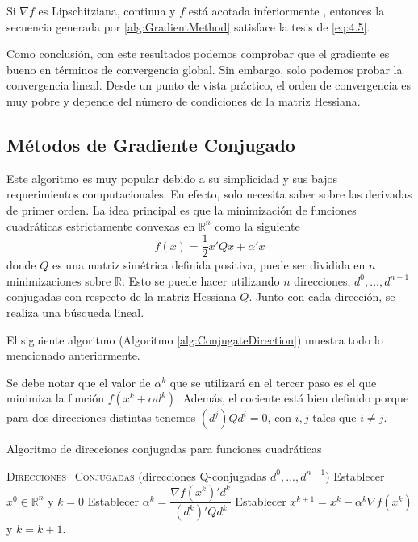 \begin{proposicion}
Si $\nabla f$ es Lipschitziana, continua y $f$ está acotada inferiormente , entonces la secuencia generada por \ref{alg:GradientMethod} satisface la tesis de \ref{eq:4.5}.
\end{proposicion}

Como conclusión, con este resultados podemos comprobar que el gradiente es bueno en términos de convergencia global. 
Sin embargo, solo podemos probar la convergencia lineal. 
Desde un punto de vista práctico, el orden de convergencia es muy pobre y depende del número de condiciones de la matriz Hessiana.

\subsection{Métodos de Gradiente Conjugado}

Este algoritmo es muy popular debido a su simplicidad y sus bajos requerimientos computacionales. 
En efecto, solo necesita saber sobre las derivadas de primer orden. 
La idea principal es que la minimización de funciones cuadráticas estrictamente convexas en $\mathbb{R}^n$ como la siguiente
\begin{equation}
f(x) = \dfrac{1}{2}x'Qx+\alpha'x
\label{eq:4.17}
\end{equation}
donde $Q$ es una matriz simétrica definida positiva, puede ser dividida en $n$ minimizaciones sobre $\mathbb{R}$. 
Esto se puede hacer utilizando $n$ direcciones, $d^0,...,d^{n-1}$ conjugadas con respecto de la matriz Hessiana $Q$. 
Junto con cada dirección, se realiza una búsqueda lineal.

El siguiente algoritmo (Algoritmo \ref{alg:ConjugateDirection}) muestra todo lo mencionado anteriormente.

Se debe notar que el valor de $\alpha^k$ que se utilizará en el tercer paso es el que minimiza la función $f(x^k + \alpha d^k)$. 
Además, el cociente está bien definido porque para dos direcciones distintas tenemos $(d^j)Qd^i=0$, con $i,j$ tales que $i\neq j$.

\begin{algorithm}
\caption{Algoritmo de direcciones conjugadas para funciones cuadráticas}\label{alg:ConjugateDirection}
\begin{algorithmic}[1]
\Procedure \textsc{Direcciones\_Conjugadas} (direcciones Q-conjugadas $d^0,...,d^{n-1}$)
\State Establecer $x^0\in\mathbb{R}^n$ y $k=0$
	\State Establecer $\alpha^k = \dfrac{\nabla f(x^k)'d^k}{(d^k)'Qd^k}$
	\State Establecer $x^{k+1} = x^k - \alpha^k\nabla f(x^k)$ y $k=k+1$.
\EndWhile
\EndProcedure
\end{algorithmic}
\end{algorithm}

